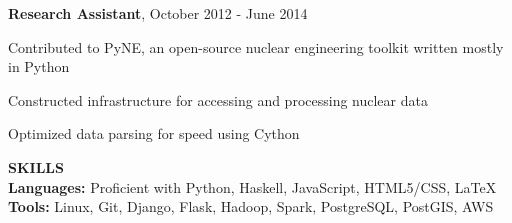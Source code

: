 \textbf{Research Assistant}, October 2012 - June 2014
\begin{tightlist}

  \item Contributed to PyNE, an open-source nuclear engineering
    toolkit written mostly in Python

  \item Constructed infrastructure for accessing and processing nuclear data

  \item Optimized data parsing for speed using Cython

\end{tightlist}
\textbf{SKILLS} \\
\textbf{Languages:} Proficient with Python, Haskell, JavaScript, HTML5/CSS, \LaTeX\\
\textbf{Tools:} Linux, Git, Django, Flask, Hadoop, Spark, PostgreSQL, PostGIS, AWS \\
\thispagestyle{empty}

